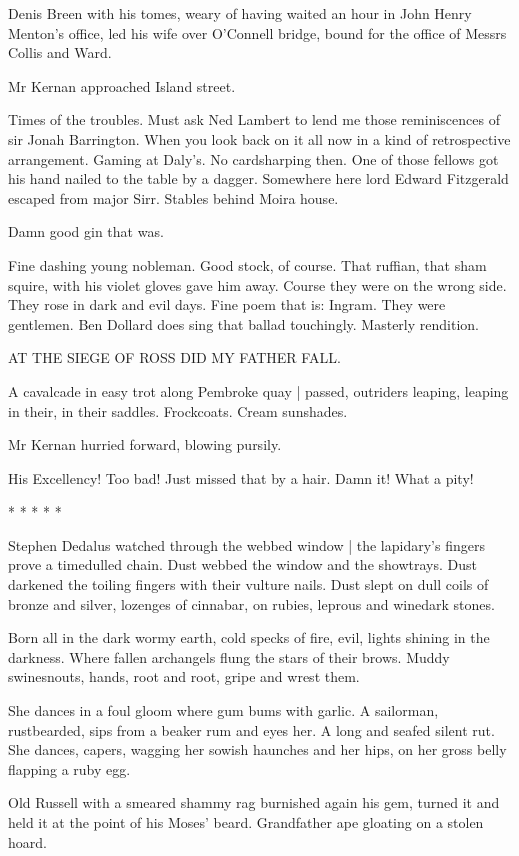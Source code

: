 Denis Breen with his tomes,
weary of having waited an hour in John Henry Menton's office,
led his wife over O'Connell bridge,
bound for the office
of Messrs Collis and Ward.

Mr Kernan approached Island street.

Times of the troubles.
Must ask Ned Lambert to lend me
those
reminiscences of sir Jonah Barrington.
When you look back on it all now
in a kind of retrospective arrangement.
Gaming at Daly's.
No cardsharping
then.
One of those fellows got his hand nailed to the table by a dagger.
Somewhere here lord Edward Fitzgerald escaped from major Sirr.
Stables
behind Moira house.

Damn good gin that was.

Fine dashing young nobleman.
Good stock, of course.
That ruffian, that sham squire, with his violet gloves
gave him away.
Course they were on the wrong side.
They rose in dark and evil days.
Fine poem that is:
Ingram.
They were gentlemen.
Ben Dollard does sing that ballad touchingly.
Masterly rendition.


    AT THE SIEGE OF ROSS DID MY FATHER FALL.


A cavalcade in easy trot along Pembroke quay |
passed,
outriders leaping, leaping in their, in their saddles.
Frockcoats.
Cream sunshades.

Mr Kernan hurried forward,
blowing pursily.

His Excellency!
Too bad!
Just missed that by a hair.
Damn it!
What a pity!


    * * * * *


Stephen Dedalus watched through the webbed window |
the lapidary's fingers prove a timedulled chain.
Dust webbed the window and the showtrays.
Dust darkened the toiling fingers with their vulture nails.
Dust slept on dull coils of bronze and silver,
lozenges of cinnabar,
on rubies,
leprous and winedark stones.

Born all in the dark wormy earth,
cold specks of fire,
evil, lights shining in the darkness.
Where fallen archangels flung the stars of their brows.
Muddy swinesnouts,
hands,
root and root,
gripe and wrest them.

She dances in a foul gloom where gum bums with garlic.
A sailorman, rustbearded, sips from a beaker rum and eyes her.
A long and seafed silent rut.
She dances, capers,
wagging her sowish haunches and her hips,
on her gross belly flapping a ruby egg.

Old Russell with a smeared shammy rag burnished again his gem,
turned it
and held it at the point of his Moses' beard.
Grandfather ape gloating on a stolen hoard.

